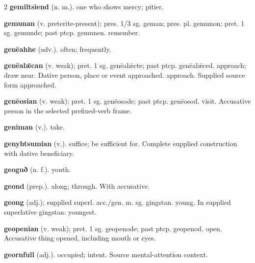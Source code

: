 \begin{multicols*}{2}
\textbf{gemiltsiend} (n. m.). one who shows mercy; pitier.\par
\textbf{gemunan} (v. preterite-present); pres. 1/3 sg. geman; pres. pl. gemunon; pret. 1 sg. gemunde; past ptcp. gemunen. remember.\par
\textbf{genēahhe} (adv.). often; frequently.\par
\textbf{genēalǣcan} (v. weak); pret. 1 sg. genēalǣcte; past ptcp. genēalǣced. approach; draw near. Dative person, place or event approached. approach. Supplied source form approached.\par
\textbf{genēosian} (v. weak); pret. 1 sg. genēosode; past ptcp. genēosod. visit. Accusative person in the selected prefixed-verb frame.\par
\textbf{geniman} (v.). take.\par
\textbf{genyhtsumian} (v.). suffice; be sufficient for. Complete supplied construction with dative beneficiary.\par
\textbf{geoguð} (n. f.). youth.\par
\textbf{geond} (prep.). along; through. With accusative.\par
\textbf{geong} (adj.); supplied superl. acc./gen. m. sg. gingstan. young. In supplied superlative gingstan: youngest.\par
\textbf{geopenian} (v. weak); pret. 1 sg. geopenode; past ptcp. geopenod. open. Accusative thing opened, including mouth or eyes.\par
\textbf{geornfull} (adj.). occupied; intent. Source mental-attention context.\par

\end{multicols*}
